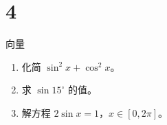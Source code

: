 \chapter{4}{向量}

\begin{enumerate}
  \item 化简 $\sin^2 x+\cos^2 x$。
  \item 求 $\sin 15^\circ$ 的值。
  \item 解方程 $2\sin x=1$，$x\in[0,2\pi]$。
\end{enumerate}
